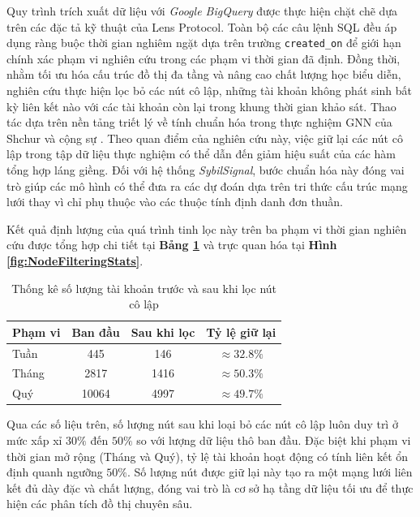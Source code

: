 Quy trình trích xuất dữ liệu với \textit{Google BigQuery} được thực hiện chặt chẽ dựa trên các đặc tả kỹ thuật của Lens Protocol. Toàn bộ các câu lệnh SQL đều áp dụng ràng buộc thời gian nghiêm ngặt dựa trên trường \texttt{created\_on} để giới hạn chính xác phạm vi nghiên cứu trong các phạm vi thời gian đã định. Đồng thời, nhằm tối ưu hóa cấu trúc đồ thị đa tầng và nâng cao chất lượng học biểu diễn, nghiên cứu thực hiện lọc bỏ các nút cô lập, những tài khoản không phát sinh bất kỳ liên kết nào với các tài khoản còn lại trong khung thời gian khảo sát. Thao tác dựa trên nền tảng triết lý về tính chuẩn hóa trong thực nghiệm GNN của Shchur và cộng sự \cite{shchur2018pitfalls}. Theo quan điểm của nghiên cứu này, việc giữ lại các nút cô lập trong tập dữ liệu thực nghiệm có thể dẫn đến giảm hiệu suất của các hàm tổng hợp láng giềng. Đối với hệ thống \textit{SybilSignal}, bước chuẩn hóa này đóng vai trò giúp các mô hình có thể đưa ra các dự đoán dựa trên tri thức cấu trúc mạng lưới thay vì chỉ phụ thuộc vào các thuộc tính định danh đơn thuần.\vspace{0.3cm}

Kết quả định lượng của quá trình tinh lọc này trên ba phạm vi thời gian nghiên cứu được tổng hợp chi tiết tại \textbf{Bảng \ref{tab:NodeFilteringStats}} và trực quan hóa tại \textbf{Hình \ref{fig:NodeFilteringStats}}. 

\begin{table}[H]
    \centering
    \caption{Thống kê số lượng tài khoản trước và sau khi lọc nút cô lập}
    \label{tab:NodeFilteringStats}
    \setlength{\tabcolsep}{10pt}
    \renewcommand{\arraystretch}{1.3}
    \begin{tabular}{|l|c|c|c|}
        \hline
        \textbf{Phạm vi} & \textbf{Ban đầu} & \textbf{Sau khi lọc} & \textbf{Tỷ lệ giữ lại} \\ \hline
        Tuần  & 445    & 146   & $\approx 32.8\%$ \\ \hline
        Tháng & 2817   & 1416  & $\approx 50.3\%$ \\ \hline
        Quý   & 10064  & 4997  & $\approx 49.7\%$ \\ \hline
    \end{tabular}
\end{table}

Qua các số liệu trên, số lượng nút sau khi loại bỏ các nút cô lập luôn duy trì ở mức xấp xỉ $30\%$ đến $50\%$ so với lượng dữ liệu thô ban đầu. Đặc biệt khi phạm vi thời gian mở rộng (Tháng và Quý), tỷ lệ tài khoản hoạt động có tính liên kết ổn định quanh ngưỡng $50\%$. Số lượng nút được giữ lại này tạo ra một mạng lưới liên kết đủ dày đặc và chất lượng, đóng vai trò là cơ sở hạ tầng dữ liệu tối ưu để thực hiện các phân tích đồ thị chuyên sâu.


